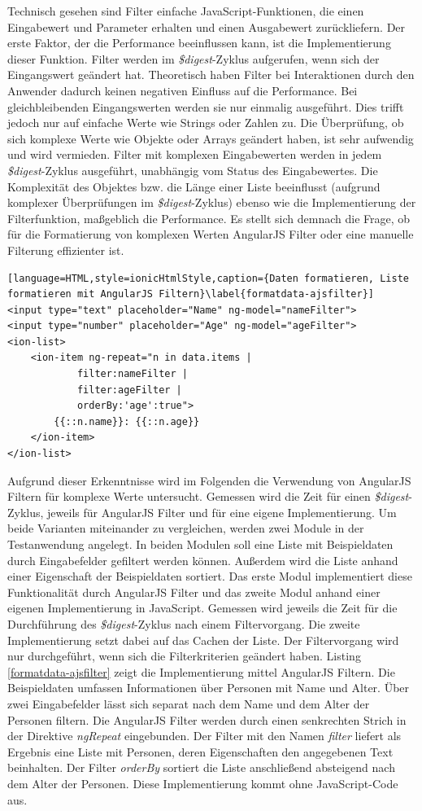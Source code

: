 Technisch gesehen sind Filter einfache JavaScript-Funktionen, die einen Eingabewert und Parameter erhalten und einen Ausgabewert zurückliefern. Der erste Faktor, der die Performance beeinflussen kann, ist die Implementierung dieser Funktion. Filter werden im \emph{\$digest}-Zyklus aufgerufen, wenn sich der Eingangswert geändert hat. Theoretisch haben Filter bei Interaktionen durch den Anwender dadurch keinen negativen Einfluss auf die Performance. Bei gleichbleibenden Eingangswerten werden sie nur einmalig ausgeführt. Dies trifft jedoch nur auf einfache Werte wie Strings oder Zahlen zu. Die Überprüfung, ob sich komplexe Werte wie Objekte oder Arrays geändert haben, ist sehr aufwendig und wird vermieden. Filter mit komplexen Eingabewerten werden in jedem \emph{\$digest}-Zyklus ausgeführt, unabhängig vom Status des Eingabewertes. Die Komplexität des Objektes bzw. die Länge einer Liste beeinflusst (aufgrund komplexer Überprüfungen im \emph{\$digest}-Zyklus) ebenso wie die Implementierung der Filterfunktion, maßgeblich die Performance. Es stellt sich demnach die Frage, ob für die Formatierung von komplexen Werten AngularJS Filter oder eine manuelle Filterung effizienter ist.\cite{BNSF}
\begin{lstlisting}[language=HTML,style=ionicHtmlStyle,caption={Daten formatieren, Liste formatieren mit AngularJS Filtern}\label{formatdata-ajsfilter}]
<input type="text" placeholder="Name" ng-model="nameFilter">
<input type="number" placeholder="Age" ng-model="ageFilter">
<ion-list>
	<ion-item ng-repeat="n in data.items | 
			filter:nameFilter | 
			filter:ageFilter | 
			orderBy:'age':true">
		{{::n.name}}: {{::n.age}}
	</ion-item>
</ion-list>
\end{lstlisting}  
Aufgrund dieser Erkenntnisse wird im Folgenden die Verwendung von AngularJS Filtern für komplexe Werte untersucht. Gemessen wird die Zeit für einen \emph{\$digest}-Zyklus, jeweils für AngularJS Filter und für eine eigene Implementierung. Um beide Varianten miteinander zu vergleichen, werden zwei Module in der Testanwendung angelegt. In beiden Modulen soll eine Liste mit Beispieldaten durch Eingabefelder gefiltert werden können. Außerdem wird die Liste anhand einer Eigenschaft der Beispieldaten sortiert. Das erste Modul implementiert diese Funktionalität durch AngularJS Filter und das zweite Modul anhand einer eigenen Implementierung in JavaScript. Gemessen wird jeweils die Zeit für die Durchführung des \emph{\$digest}-Zyklus nach einem Filtervorgang. Die zweite Implementierung setzt dabei auf das Cachen der Liste. Der Filtervorgang wird nur durchgeführt, wenn sich die Filterkriterien geändert haben. Listing \ref{formatdata-ajsfilter} zeigt die Implementierung mittel AngularJS Filtern. Die Beispieldaten umfassen Informationen über Personen mit Name und Alter. Über zwei Eingabefelder lässt sich separat nach dem Name und dem Alter der Personen filtern. Die AngularJS Filter werden durch einen senkrechten Strich in der Direktive \emph{ngRepeat} eingebunden. Der Filter mit den Namen \emph{filter} liefert als Ergebnis eine Liste mit Personen, deren Eigenschaften den angegebenen Text beinhalten. Der Filter \emph{orderBy} sortiert die Liste anschließend absteigend nach dem Alter der Personen. Diese Implementierung kommt ohne JavaScript-Code aus. 
